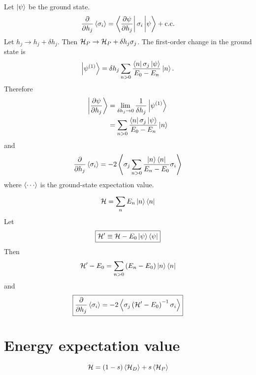 Let $\left| \psi \right>$ be the ground state.
\begin{equation}
  \pd{}{h_j} \avg{\sigma_i}
  = \matrixel{\pd{\psi}{h_j}}{\sigma_i}{\psi} + \cc
  \label{}
\end{equation}
Let
$h_j \rightarrow h_j + \delta h_j$.
Then
$\mathcal{H}_P \rightarrow \mathcal{H}_P + \delta h_j \sigma_j$.
The first-order change in the ground state is
\begin{equation}
  \ket{\psi^{(1)}}
  = \delta h_j \sum_{n>0} \frac{\matrixel{n}{\sigma_j}{\psi}}{E_0 - E_n} \ket{n}.
  \label{}
\end{equation}
Therefore
\begin{align}
  \ket{\pd{\psi}{h_j}}
  &= \lim_{\delta h_j \rightarrow 0} \frac{1}{\delta h_j} \ket{\psi^{(1)}} \\
  &= \sum_{n>0} \frac{\matrixel{n}{\sigma_j}{\psi}}{E_0 - E_n} \ket{n}
  \label{}
\end{align}
and
\begin{equation}
  \frac{\partial }{\partial h_j} \left< \sigma_i \right>
  = -2 \left< \sigma_j \sum_{n>0} \frac{\left| n \right> \left< n \right|}{E_n - E_0} \sigma_i \right>
  \label{}
\end{equation}
where $\avg{\cdots}$ is the ground-state expectation value.

\begin{equation}
  \mathcal{H} = \sum_n E_n \left| n \right> \left< n \right|
  \label{}
\end{equation}
Let
\begin{equation}
  \boxed{
  \mathcal{H}^{\prime} \equiv \mathcal{H} - E_0 \left| \psi \right> \left< \psi \right|
  }
  \label{}
\end{equation}
Then
\begin{equation}
  \mathcal{H}^{\prime} - E_0 = \sum_{n>0} \left( E_n - E_0 \right) \left| n \right> \left< n \right|
  \label{}
\end{equation}
and
\begin{equation}
  \boxed{
  \frac{\partial }{\partial h_j} \left< \sigma_i \right>
  = -2 \left< \sigma_j \left( \mathcal{H}^{\prime} - E_0 \right)^{-1} \sigma_i \right>
  }
  \label{}
\end{equation}

\section*{Energy expectation value}

\begin{equation}
  \mathcal{H} = (1 - s) \left< \mathcal{H}_D \right> + s \left< \mathcal{H}_P \right>
  \label{}
\end{equation}


